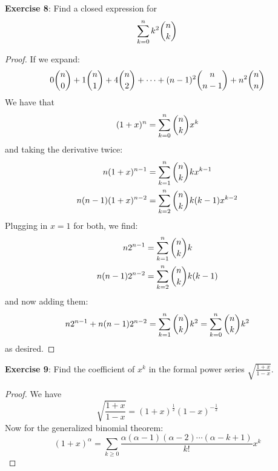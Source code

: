 \documentclass{article}
\begin{document}
\textbf{Exercise 8}: Find a closed expression for 
    \begin{equation*}
        \sum_{k = 0}^{n}k^{2}\dbinom{n}{k}
    \end{equation*}
\begin{proof}
    If we expand:
        \begin{equation*}
            0\dbinom{n}{0} + 1\dbinom{n}{1} + 4\dbinom{n}{2} + \cdots + (n - 1)^{2} \dbinom{n}{n - 1} + n^{2}\dbinom{n}{n}
        \end{equation*}
    We have that 
        \begin{equation*}
            (1 + x)^{n} = \sum_{k = 0}^{n}\dbinom{n}{k}x^{k}
        \end{equation*}
    and taking the derivative twice:
        \begin{align*}
            n(1 + x)^{n - 1}        &= \sum_{k = 1}^{n}\dbinom{n}{k}kx^{k - 1}        \\
            n(n - 1)(1 + x)^{n - 2} &= \sum_{k = 2}^{n}\dbinom{n}{k}k(k - 1)x^{k - 2}   
        \end{align*}
    Plugging in $x = 1$ for both, we find:
        \begin{align*}
            n2^{n - 1}        &= \sum_{k = 1}^{n}\dbinom{n}{k}k        \\
            n(n - 1)2^{n - 2} &= \sum_{k = 2}^{n}\dbinom{n}{k}k(k - 1)   
        \end{align*}
    and now adding them:
        \begin{equation*}
            n2^{n - 1} + n(n - 1)2^{n - 2} = \sum_{k = 1}^{n}\dbinom{n}{k}k^{2} = \sum_{k = 0}^{n}\dbinom{n}{k}k^{2}
        \end{equation*}
    as desired.
\end{proof}

\textbf{Exercise 9}: Find the coefficient of $x^{k}$ in the formal power series $\sqrt{\frac{1 + x}{1 - x}}$.
    \begin{proof}
        We have
            \begin{equation*}
                \sqrt{\dfrac{1 + x}{1 - x}} = (1 + x)^{\frac{1}{2}}(1 - x)^{-\frac{1}{2}}
            \end{equation*}
        Now for the generalized binomial theorem:
            \begin{equation*}
                (1 + x)^{\alpha} = \sum_{k \geq 0} \dfrac{\alpha(\alpha - 1)(\alpha - 2) \cdots (\alpha - k + 1)}{k!}x^{k}
            \end{equation*}
        
    \end{proof}
\end{document}
